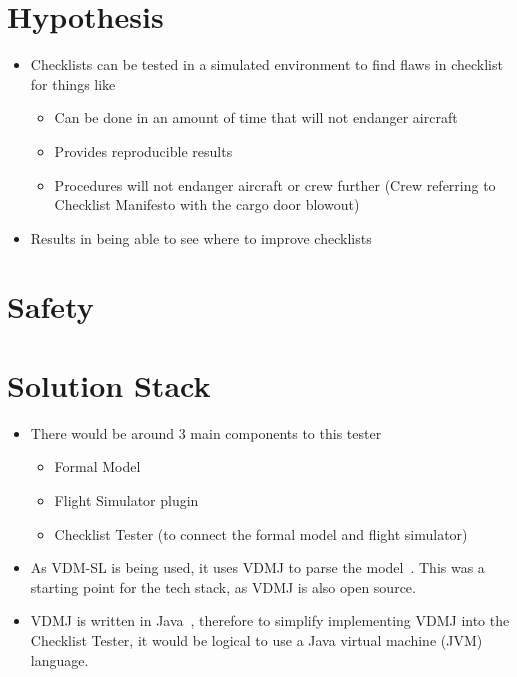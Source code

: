 \documentclass[../dissertation.tex]{subfiles}
\begin{document}
\section{Hypothesis}
\begin{itemize}
    \item Checklists can be tested in a simulated environment 
      to find flaws in checklist for things like
      \begin{itemize}
        \item Can be done in an amount of time that will not endanger aircraft
        \item Provides reproducible results
        \item Procedures will not endanger aircraft or crew further (Crew referring to Checklist Manifesto with the cargo door blowout)
      \end{itemize}
    \item Results in being able to see where to improve checklists
\end{itemize}


\section{Safety}


\section{Solution Stack}
\begin{itemize}
  \item There would be around 3 main components to this tester
    \begin{itemize}
      \item Formal Model
      \item Flight Simulator plugin
      \item Checklist Tester (to connect the formal model and flight simulator)
    \end{itemize}
  \item As VDM-SL is being used, it uses VDMJ to parse the model~\cite{vdmj}. This was a starting
    point for the tech stack, as VDMJ is also open source.
  \item VDMJ is written in Java~\cite{vdmj}, therefore to simplify implementing VDMJ into the
    Checklist Tester, it would be logical to use a Java virtual machine (JVM) language.
\end{itemize}
\end{document}
